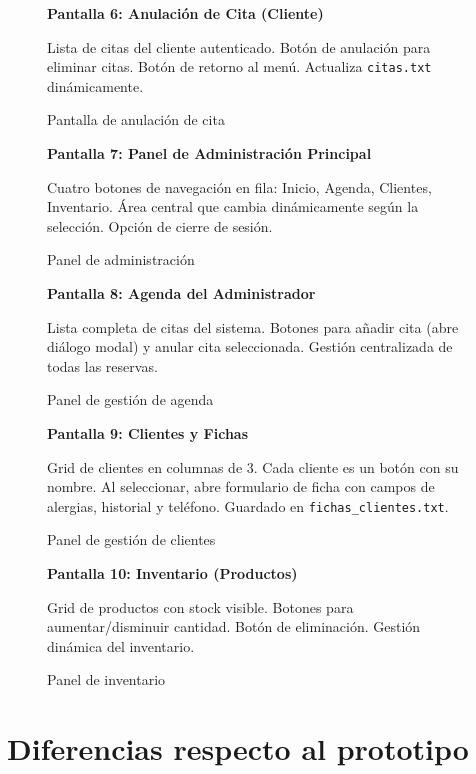 \documentclass[12pt,a4paper]{report}
\begin{document}
\begin{figure}[htbp]
    \centering
    \textbf{Pantalla 6: Anulación de Cita (Cliente)}
    
    Lista de citas del cliente autenticado. Botón de anulación para eliminar citas. Botón de retorno al menú. Actualiza \texttt{citas.txt} dinámicamente.
    \caption{Pantalla de anulación de cita}
\end{figure}

\begin{figure}[htbp]
    \centering
    \textbf{Pantalla 7: Panel de Administración Principal}
    
    Cuatro botones de navegación en fila: Inicio, Agenda, Clientes, Inventario. Área central que cambia dinámicamente según la selección. Opción de cierre de sesión.
    \caption{Panel de administración}
\end{figure}

\begin{figure}[htbp]
    \centering
    \textbf{Pantalla 8: Agenda del Administrador}
    
    Lista completa de citas del sistema. Botones para añadir cita (abre diálogo modal) y anular cita seleccionada. Gestión centralizada de todas las reservas.
    \caption{Panel de gestión de agenda}
\end{figure}

\begin{figure}[htbp]
    \centering
    \textbf{Pantalla 9: Clientes y Fichas}
    
    Grid de clientes en columnas de 3. Cada cliente es un botón con su nombre. Al seleccionar, abre formulario de ficha con campos de alergias, historial y teléfono. Guardado en \texttt{fichas\_clientes.txt}.
    \caption{Panel de gestión de clientes}
\end{figure}

\begin{figure}[htbp]
    \centering
    \textbf{Pantalla 10: Inventario (Productos)}
    
    Grid de productos con stock visible. Botones para aumentar/disminuir cantidad. Botón de eliminación. Gestión dinámica del inventario.
    \caption{Panel de inventario}
\end{figure}

\chapter{Diferencias respecto al prototipo}
\end{document}
